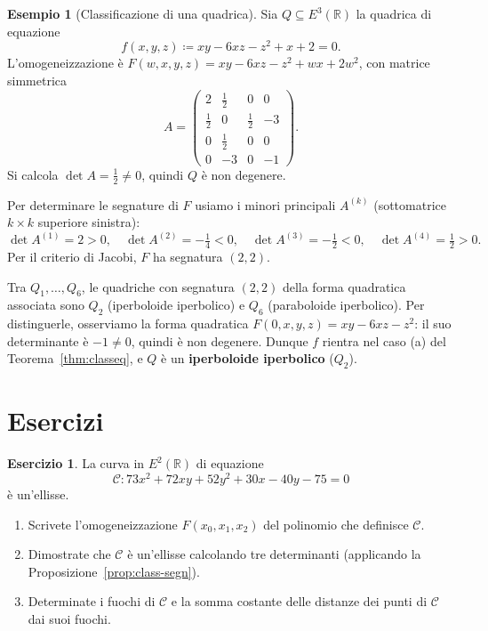\documentclass[11pt, a4paper]{book}
\theoremstyle{definition}
\newtheorem{esempio}[definizione]{Esempio}
\newtheorem{esercizio}[definizione]{Esercizio}
\theoremstyle{plain}
\theoremstyle{remark}
\newcommand{\R}{\mathbb{R}}
\begin{document}
\begin{exbox}
\begin{esempio}[Classificazione di una quadrica]
\label{es:quadrica}
Sia $Q \subseteq E^3(\R)$ la quadrica di equazione
\[
  f(x,y,z) \coloneqq xy - 6xz - z^2 + x + 2 = 0.
\]
L'omogeneizzazione è $F(w,x,y,z) = xy - 6xz - z^2 + wx + 2w^2$, con matrice simmetrica
\[
  A = \begin{pmatrix} 2 & \frac{1}{2} & 0 & 0 \\ \frac{1}{2} & 0 & \frac{1}{2} & -3 \\ 0 & \frac{1}{2} & 0 & 0 \\ 0 & -3 & 0 & -1 \end{pmatrix}.
\]
Si calcola $\det A = \frac{1}{2} \neq 0$, quindi $Q$ è non degenere.

Per determinare le segnature di $F$ usiamo i minori principali $A^{(k)}$ (sottomatrice $k\times k$ superiore sinistra):
\[
  \det A^{(1)} = 2 > 0, \quad \det A^{(2)} = -\tfrac{1}{4} < 0, \quad \det A^{(3)} = -\tfrac{1}{2} < 0, \quad \det A^{(4)} = \tfrac{1}{2} > 0.
\]
Per il criterio di Jacobi, $F$ ha segnatura $(2,2)$.

Tra $Q_1,\ldots,Q_6$, le quadriche con segnatura $(2,2)$ della forma quadratica associata sono $Q_2$ (iperboloide iperbolico) e $Q_6$ (paraboloide iperbolico). Per distinguerle, osserviamo la forma quadratica $F(0,x,y,z) = xy - 6xz - z^2$: il suo determinante è $-1 \neq 0$, quindi è non degenere. Dunque $f$ rientra nel caso (a) del Teorema~\ref{thm:classeq}, e $Q$ è un \textbf{iperboloide iperbolico} ($Q_2$).
\end{esempio}
\end{exbox}

\section*{Esercizi}
\label{sec:es-cap10}

\begin{esercizio}
La curva in $E^2(\R)$ di equazione
\[
  \mathcal{C} \colon 73x^2 + 72xy + 52y^2 + 30x - 40y - 75 = 0
\]
è un'ellisse.
\begin{enumerate}[label=(\arabic*)]
  \item Scrivete l'omogeneizzazione $F(x_0, x_1, x_2)$ del polinomio che definisce $\mathcal{C}$.
  \item Dimostrate che $\mathcal{C}$ è un'ellisse calcolando tre determinanti (applicando la Proposizione~\ref{prop:class-segn}).
  \item Determinate i fuochi di $\mathcal{C}$ e la somma costante delle distanze dei punti di $\mathcal{C}$ dai suoi fuochi.
\end{enumerate}
\end{esercizio}
\end{document}
